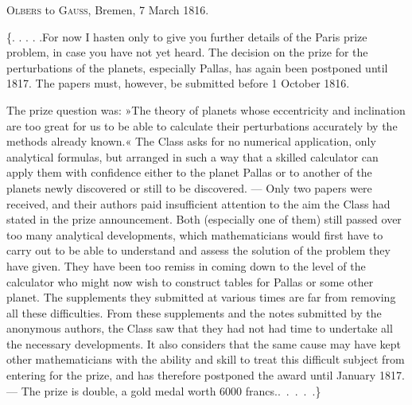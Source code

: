 \par{}\bigskip
\begin{center}
\textsc{Olbers} to \textsc{Gauss}, Bremen, 7 March 1816.
\end{center}
\noindent\hspace*{\parindent}\{. . . . .\quad For now I hasten only to give you further details of the Paris prize problem, in case you have not yet heard. The decision on the prize for the perturbations of the planets, especially Pallas, has again been postponed until 1817. The papers must, however, be submitted before 1 October 1816.
\par The prize question was: »The theory of planets whose eccentricity and inclination are too great for us to be able to calculate their perturbations accurately by the methods already known.« The Class asks for no numerical application, only analytical formulas, but arranged in such a way that a skilled calculator can apply them with confidence either to the planet Pallas or to another of the planets newly discovered or still to be discovered. — Only two papers were received, and their authors paid insufficient attention to the aim the Class had stated in the prize announcement. Both (especially one of them) still passed over too many analytical developments, which mathematicians would first have to carry out to be able to understand and assess the solution of the problem they have given. They have been too remiss in coming down to the level of the calculator who might now wish to construct tables for Pallas or some other planet. The supplements they submitted at various times are far from removing all these difficulties. From these supplements and the notes submitted by the anonymous authors, the Class saw that they had not had time to undertake all the necessary developments. It also considers that the same cause may have kept other mathematicians with the ability and skill to treat this difficult subject from entering for the prize, and has therefore postponed the award until January 1817. — The prize is double, a gold medal worth 6000 francs.\quad\mbox{. . . . .\}}
\par
